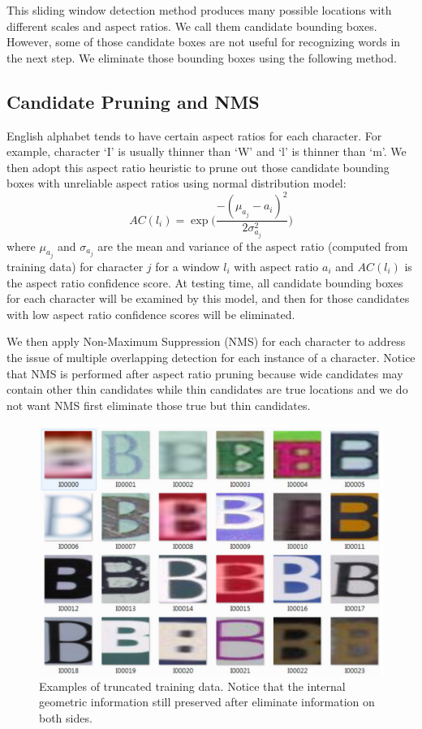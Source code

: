 \documentclass[10pt,twocolumn,letterpaper]{article}
\begin{document}
This sliding window detection method produces many possible locations with different scales and aspect ratios. We call them candidate bounding boxes. However, some of those candidate boxes are not useful for recognizing words in the next step. We eliminate those bounding boxes using the following method.

\subsection{Candidate Pruning and NMS}

English alphabet tends to have certain aspect ratios for each character. For example, character `I' is usually thinner than `W' and `l' is thinner than `m'. We then adopt this aspect ratio heuristic to prune out those candidate bounding boxes with unreliable aspect ratios using normal distribution model:
\[
AC(l_i) = \exp \Bigg( \frac{-(\mu_{a_j} - a_i)^2}{2\sigma_{a_j}^2} \Bigg)
\]
where $\mu_{a_j}$ and $\sigma_{a_j}$ are the mean and variance of the aspect ratio (computed from training data) for character $j$ for a window $l_i$ with aspect ratio $a_i$ and $AC(l_i)$ is the aspect ratio confidence score. At testing time, all candidate bounding boxes for each character will be examined by this model, and then for those candidates with low aspect ratio confidence scores will be eliminated.

We then apply Non-Maximum Suppression (NMS) for each character to address the issue of multiple overlapping detection for each instance of a character. Notice that NMS is performed after aspect ratio pruning because wide candidates may contain other thin candidates while thin candidates are true locations and we do not want NMS first eliminate those true but thin candidates.

\begin{figure}[t]
\begin{center}
\includegraphics[width=1\linewidth]{fig/p4}
\end{center}
   \caption{Examples of truncated training data. Notice that the internal geometric information still preserved after eliminate information on both sides.}
\label{fig:sample1}
\end{figure}
\end{document}
